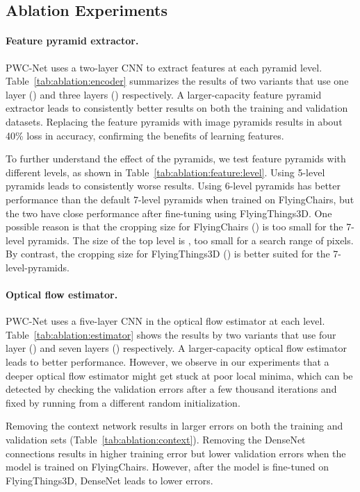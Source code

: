 \documentclass[10pt,journal,cspaper,compsoc]{IEEEtran}
\newcommand{\beforePara}{\vspace{-0em}}
\begin{document}
	
\subsection{Ablation Experiments}
		
\paragraph{Feature pyramid extractor.}
	PWC-Net uses a two-layer CNN to extract features at each pyramid level. Table~\ref{tab:ablation:encoder} summarizes the results of two variants that use one layer () and three layers () respectively. A larger-capacity feature pyramid extractor leads to consistently better results on both the training and validation datasets. Replacing the feature pyramids with image pyramids results in about 40\% loss in accuracy, confirming the benefits of learning features. 
	
	To further understand the effect of the pyramids, we test feature pyramids with different levels, as shown in Table~\ref{tab:ablation:feature:level}. Using 5-level pyramids leads to consistently worse results. Using 6-level pyramids has better performance than the default 7-level pyramids when trained on FlyingChairs, but the two have close performance after fine-tuning using FlyingThings3D. One possible reason is that the cropping size for FlyingChairs () is too small for the 7-level pyramids. The size of the top level is , too small for a search range of  pixels. By contrast, the cropping size for FlyingThings3D () is better suited for the 7-level-pyramids. 
	
	
	\beforePara
	\paragraph{Optical flow estimator.}
	PWC-Net uses a five-layer CNN in the optical flow estimator at each level. Table~\ref{tab:ablation:estimator} shows the results by two variants that use four layer () and seven layers () respectively. A larger-capacity optical flow estimator leads to better performance. However, we observe in our experiments that a deeper optical flow estimator might get stuck at poor local minima, which can be detected by checking the validation errors after a few thousand iterations and fixed by running from a different random initialization. 
	
Removing the context network results in larger errors on both the training and validation sets (Table~\ref{tab:ablation:context}). Removing the DenseNet connections results in higher training error but lower validation errors when the model is trained on FlyingChairs. However, after the model is fine-tuned on FlyingThings3D, DenseNet leads to lower  errors. 
	
\end{document}
